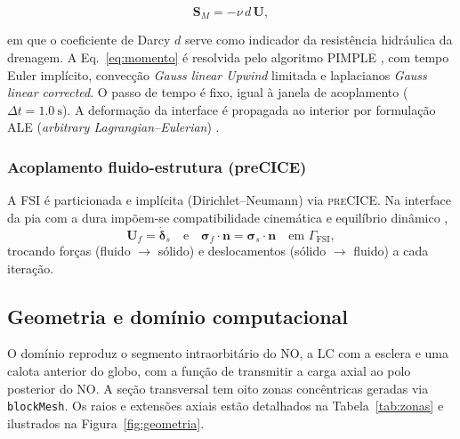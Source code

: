 \documentclass[article, hidelinks,oneside,12pt]{abntex2}
\begin{document}
\begin{equation}
  \mathbf{S}_M = -\nu\,d\,\mathbf{U},
  \label{eq:darcy}
\end{equation}

em que o coeficiente de Darcy $d$ serve como indicador da resistência hidráulica da drenagem. A Eq.~\eqref{eq:momento} é resolvida pelo algoritmo PIMPLE \cite{versteeg, ferziger}, com tempo Euler implícito, convecção \textit{Gauss linear Upwind} limitada e laplacianos \textit{Gauss linear corrected}. O passo de tempo é fixo, igual à janela de acoplamento ($\Delta t = \SI{1.0}{\second}$). A deformação da interface é propagada ao interior por formulação ALE (\textit{arbitrary Lagrangian--Eulerian}) \cite{donea2003}.


\subsubsection*{Acoplamento fluido-estrutura (preCICE)}
\label{sec:teoria-fsi}

A FSI é particionada e implícita (Dirichlet--Neumann) via \textsc{preCICE}. Na interface da pia com a dura impõem-se compatibilidade cinemática e equilíbrio dinâmico \cite{bazilevs2013},
\begin{equation}
  \mathbf{U}_f = \dot{\boldsymbol{\delta}}_s
  \quad\text{e}\quad
  \boldsymbol{\sigma}_f\!\cdot\!\mathbf{n} = \boldsymbol{\sigma}_s\!\cdot\!\mathbf{n}
  \quad\text{em } \Gamma_{\mathrm{FSI}},
  \label{eq:fsi-interface}
\end{equation}
trocando forças (fluido $\rightarrow$ sólido) e deslocamentos (sólido $\rightarrow$ fluido) a cada iteração.


\subsection*{Geometria e domínio computacional}

O domínio reproduz o segmento intraorbitário do NO, a LC com a esclera e uma calota anterior do globo, com a função de transmitir a carga axial ao polo posterior do NO. A seção transversal tem oito zonas concêntricas geradas via \texttt{blockMesh}. Os raios e extensões axiais estão detalhados na Tabela~\ref{tab:zonas} e ilustrados na Figura~\ref{fig:geometria}.
\end{document}
